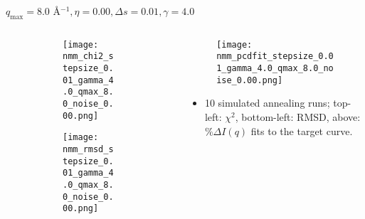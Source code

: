\documentclass{beamer}
\begin{document}
\begin{frame}{$ q_{\textrm{max}}=8.0 $ \AA $^{-1}, \eta=0.00, \Delta s=0.01, \gamma=4.0$}
	\begin{columns}
		\begin{column}{.5\textwidth}
			\begin{figure}[H]
			\centering
			\begin{subfigure}[b]{\textwidth}
				\centering
				\texttt{[image: nmm\_chi2\_stepsize\_0.01\_gamma\_4.0\_qmax\_8.0\_noise\_0.00.png]}
				\label{fig:}
			\end{subfigure}
			\begin{subfigure}[b]{\textwidth}
				\centering
				\texttt{[image: nmm\_rmsd\_stepsize\_0.01\_gamma\_4.0\_qmax\_8.0\_noise\_0.00.png]}
				\label{fig:}
			\end{subfigure}
			\end{figure}
		\end{column}
		\begin{column}{.5\textwidth}
			\begin{figure}[H]
				\centering
				\texttt{[image: nmm\_pcdfit\_stepsize\_0.01\_gamma\_4.0\_qmax\_8.0\_noise\_0.00.png]}
				\label{fig:}
			\end{figure}
			\begin{itemize}
				\item 10 simulated annealing runs; top-left: $\chi^2$, bottom-left: RMSD, above: $\%\Delta I(q)$ fits to the target curve.
			\end{itemize}
		\end{column}
	\end{columns}
\end{frame}
 
\end{document}
